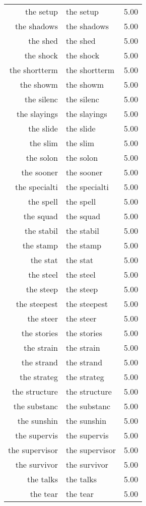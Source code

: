 \begin{table}[ht]
\begin{tabular}{rlr}
  the setup & the setup & 5.00 \\ 
  the shadows & the shadows & 5.00 \\ 
  the shed & the shed & 5.00 \\ 
  the shock & the shock & 5.00 \\ 
  the shortterm & the shortterm & 5.00 \\ 
  the showm & the showm & 5.00 \\ 
  the silenc & the silenc & 5.00 \\ 
  the slayings & the slayings & 5.00 \\ 
  the slide & the slide & 5.00 \\ 
  the slim & the slim & 5.00 \\ 
  the solon & the solon & 5.00 \\ 
  the sooner & the sooner & 5.00 \\ 
  the specialti & the specialti & 5.00 \\ 
  the spell & the spell & 5.00 \\ 
  the squad & the squad & 5.00 \\ 
  the stabil & the stabil & 5.00 \\ 
  the stamp & the stamp & 5.00 \\ 
  the stat & the stat & 5.00 \\ 
  the steel & the steel & 5.00 \\ 
  the steep & the steep & 5.00 \\ 
  the steepest & the steepest & 5.00 \\ 
  the steer & the steer & 5.00 \\ 
  the stories & the stories & 5.00 \\ 
  the strain & the strain & 5.00 \\ 
  the strand & the strand & 5.00 \\ 
  the strateg & the strateg & 5.00 \\ 
  the structure & the structure & 5.00 \\ 
  the substanc & the substanc & 5.00 \\ 
  the sunshin & the sunshin & 5.00 \\ 
  the supervis & the supervis & 5.00 \\ 
  the supervisor & the supervisor & 5.00 \\ 
  the survivor & the survivor & 5.00 \\ 
  the talks & the talks & 5.00 \\ 
  the tear & the tear & 5.00 \\ 

\end{tabular}
\end{table}
